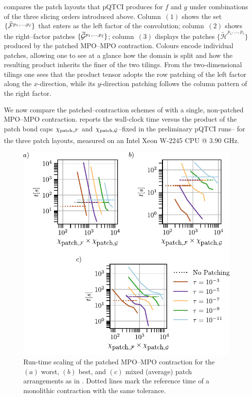  compares the patch layouts that pQTCI produces for \(f\) and \(g\) under combinations of the three slicing orders introduced above.  
Column~$(1)$ shows the set \(\{\widetilde{\mathcal{F}}^{p_{1},\dots,p_{\bar\ell}}\}\) that enters as the left factor of the convolution; column~$(2)$ shows the right–factor patches
\(\{\widetilde{\mathcal{G}}^{p_{1},\dots,p_{\bar\ell}}\}\); column~$(3)$ displays the patches \(\{\widetilde{\mathcal H}^{p_{1},\dots,p_{\bar\ell}}\}\) produced by the patched MPO–MPO contraction. Colours encode individual patches, allowing one to see at a glance how the
domain is split and how the resulting product inherits the finer of the two tilings. From the two-dimensional tilings one sees that the product tensor adopts the row patching of the left factor along the $x$-direction, while its $y$-direction patching follows the column pattern of the right factor.

We now compare the patched–contraction schemes of  with a single, non-patched MPO–MPO contraction.  
 reports the wall-clock time versus the product of the  patch bond caps \(\chi_{\text{patch}, \mathcal{F}}\) and  \(\chi_{\text{patch}, \mathcal{G}}\)--fixed in the preliminary pQTCI runs-- for the three patch layouts, measured on an Intel\textsuperscript{\textregistered}  Xeon\textsuperscript{\textregistered} W-2245 CPU @ 3.90 GHz.
\begin{figure}[htbp]
    \centering
    \includegraphics{figures/patchedMulResults.pdf}
    \caption{ Run-time scaling of the patched MPO–MPO contraction for the $(a)$ worst,
    $(b)$ best, and $(c)$ mixed (average) patch arrangements as in . Dotted lines mark the reference time of a monolithic contraction with the same tolerance. }
    \label{fig:patchedMulResults}
\end{figure}

